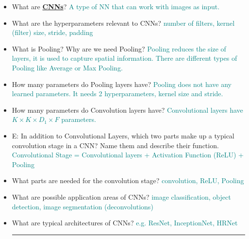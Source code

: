 \documentclass{report}
\newcommand{\asw}[2][teal]{}
\renewcommand{\asw}[2][teal]{\textcolor{#1}{#2}}
\begin{document}
\begin{itemize}
		\item What are \textbf{\underline{CNNs}}?
		\asw{\newline A type of NN that can work with images as input.}
		\item What are the hyperparameters relevant to CNNs?
		\asw{\newline number of filters, kernel (filter) size, stride, padding}
		\item What is Pooling? Why are we need Pooling?
		\asw{\newline Pooling reduces the size of layers, it is used to capture spatial information. There are different types of Pooling like Average or Max Pooling.}
		\item How many parameters do Pooling layers have?
		\asw{\newline Pooling does not have any learned parameters. It needs 2 hyperparameters, kernel size and stride.}
		\item How many parameters do Convolution layers have?
		\asw{\newline Convolutional layers have $K \times K \times D_1 \times F$ parameters.}
		\item E: In addition to Convolutional Layers, which two parts make up a typical convolution stage in a CNN? Name them and describe their function.
		\asw{\newline Convolutional Stage = Convolutional layers + Activation Function (ReLU) + Pooling}
		\item What parts are needed for the convolution stage?
		\asw{\newline convolution, ReLU, Pooling}
		\item What are possible application areas of CNNs?
		\asw{\newline image classification, object detection, image segmentation (deconvolutions)}
		\item What are typical architectures of CNNs?
		\asw{\newline e.g. ResNet, InceptionNet, HRNet}
		\newline
		\hrule 
		

\end{itemize}
\end{document}
